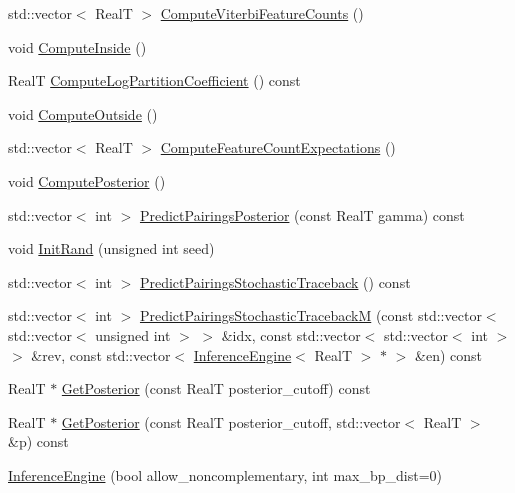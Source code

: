 \begin{DoxyCompactItemize}
\item 
std\+::vector$<$ Real\+T $>$ \hyperlink{class_inference_engine_af033e32a3d67b565b59aa632dae0152c}{Compute\+Viterbi\+Feature\+Counts} ()
\item 
void \hyperlink{class_inference_engine_ad76e23c8323b050b23e8c1c7e8046f0e}{Compute\+Inside} ()
\item 
Real\+T \hyperlink{class_inference_engine_a2e11e84d4854b492fc3ab4eda0c7aa84}{Compute\+Log\+Partition\+Coefficient} () const 
\item 
void \hyperlink{class_inference_engine_a2d0abf6db99cfd61b703d8e567bee09d}{Compute\+Outside} ()
\item 
std\+::vector$<$ Real\+T $>$ \hyperlink{class_inference_engine_a6d8a78e3c1a7dcffffa26d3ea7ddd92b}{Compute\+Feature\+Count\+Expectations} ()
\item 
void \hyperlink{class_inference_engine_aef03cd26f3758cfff297703bb37b5e9f}{Compute\+Posterior} ()
\item 
std\+::vector$<$ int $>$ \hyperlink{class_inference_engine_ab134b79d7b409072bb51a40fcd2fbcce}{Predict\+Pairings\+Posterior} (const Real\+T gamma) const 
\item 
void \hyperlink{class_inference_engine_a1d4f39be3bdae1bc9e10e2e6c5c92958}{Init\+Rand} (unsigned int seed)
\item 
std\+::vector$<$ int $>$ \hyperlink{class_inference_engine_a3355c30e213b3a6277141faeeb8dc5f1}{Predict\+Pairings\+Stochastic\+Traceback} () const 
\item 
std\+::vector$<$ int $>$ \hyperlink{class_inference_engine_a346acfcaf989aed397b5d1433c925e4a}{Predict\+Pairings\+Stochastic\+Traceback\+M} (const std\+::vector$<$ std\+::vector$<$ unsigned int $>$ $>$ \&idx, const std\+::vector$<$ std\+::vector$<$ int $>$ $>$ \&rev, const std\+::vector$<$ \hyperlink{class_inference_engine}{Inference\+Engine}$<$ Real\+T $>$ $\ast$ $>$ \&en) const 
\item 
Real\+T $\ast$ \hyperlink{class_inference_engine_a7eacc75414f604df8f894e864f8dfae9}{Get\+Posterior} (const Real\+T posterior\+\_\+cutoff) const 
\item 
Real\+T $\ast$ \hyperlink{class_inference_engine_a2d53131fbdb1963dcdc56cfffa3d2be5}{Get\+Posterior} (const Real\+T posterior\+\_\+cutoff, std\+::vector$<$ Real\+T $>$ \&p) const 
\item 
\hyperlink{class_inference_engine_ad8ecaebd1482737444c6ff701fde74de}{Inference\+Engine} (bool allow\+\_\+noncomplementary, int max\+\_\+bp\+\_\+dist=0)
\item 

\end{DoxyCompactItemize}
